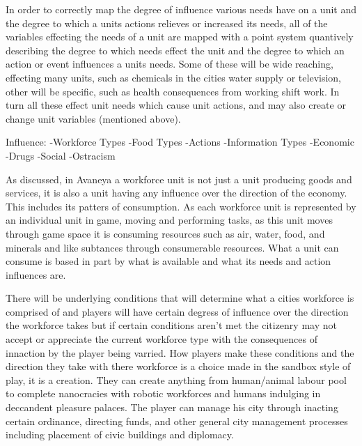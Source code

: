 In order to correctly map the degree of influence various needs have on a unit and the degree to which a units actions relieves or increased its needs, all of the variables effecting the needs of a unit are mapped with a point system quantively describing the degree to which needs effect the unit and the degree to which an action or event influences a units needs. Some of these will be wide reaching, effecting many units, such as chemicals in the cities water supply or television, other will be specific, such as health consequences from working shift work. In turn all these effect unit needs which cause unit actions, and may also create or change unit variables (mentioned above). 



Influence:
-Workforce Types
-Food Types
-Actions
-Information Types
-Economic 
-Drugs
-Social
-Ostracism



%
%
%
%
%
%
%





As discussed, in Avaneya a workforce unit is not just a unit producing goods and services, it is also a unit having any influence over the direction of the economy. This includes its patters of consumption. As each workforce unit is represented by an individual unit in game, moving and performing tasks, as this unit moves through game space it is consuming resources such as air, water, food, and minerals and like subtances through consumerable resources. What a unit can consume is based in part by what is available and what its needs and action influences are.



 



There will be underlying conditions that will determine what a cities workforce is comprised of and players will have certain degress of influence over the direction the workforce takes but if certain conditions aren't met the citizenry may not accept or appreciate the current workforce type with the consequences of innaction by the player being varried. How players make these conditions and the direction they take with there workforce is a choice made in the sandbox style of play, it is a creation. They can create anything from human/animal labour pool to complete nanocracies with robotic workforces and humans indulging in deccandent pleasure palaces. The player can manage his city through inacting certain ordinance, directing funds, and other general city management processes including placement of civic buildings and diplomacy. 






